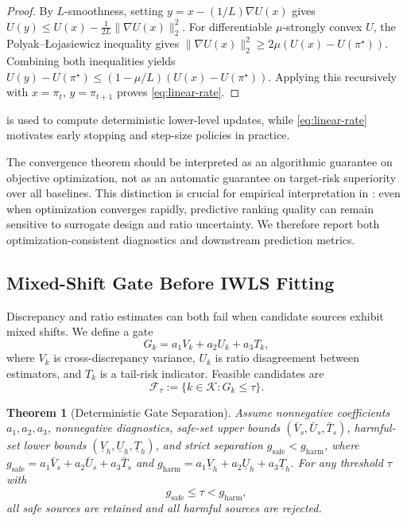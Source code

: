 \documentclass{article} %
\newtheorem{theorem}{Theorem}[section]
\begin{document}
\begin{proof}
By \(L\)-smoothness, setting \(y=x-(1/L)\nabla U(x)\) gives
\(U(y)\le U(x)-\frac{1}{2L}\|\nabla U(x)\|_2^2\).
For differentiable \(\mu\)-strongly convex \(U\), the Polyak--\L{}ojasiewicz inequality gives
\(\|\nabla U(x)\|_2^2\ge2\mu(U(x)-U(\pi^{\star}))\).
Combining both inequalities yields
\(U(y)-U(\pi^{\star})\le(1-\mu/L)(U(x)-U(\pi^{\star}))\).
Applying this recursively with \(x=\pi_t\), \(y=\pi_{t+1}\) proves \eqref{eq:linear-rate}.
\end{proof}

 is used to compute deterministic lower-level updates, while \eqref{eq:linear-rate} motivates early stopping and step-size policies in practice.

The convergence theorem should be interpreted as an algorithmic guarantee on objective optimization, not as an automatic guarantee on target-risk superiority over all baselines. This distinction is crucial for empirical interpretation in : even when optimization converges rapidly, predictive ranking quality can remain sensitive to surrogate design and ratio uncertainty. We therefore report both optimization-consistent diagnostics and downstream prediction metrics.

\subsection{Mixed-Shift Gate Before IWLS Fitting}
Discrepancy and ratio estimates can both fail when candidate sources exhibit mixed shifts. We define a gate
\begin{equation}
G_k=a_1V_k+a_2U_k+a_3T_k,
\label{eq:gate-score}
\end{equation}
where \(V_k\) is cross-discrepancy variance, \(U_k\) is ratio disagreement between estimators, and \(T_k\) is a tail-risk indicator. Feasible candidates are
\begin{equation}
\mathcal{F}_\tau:=\{k\in\mathcal{K}: G_k\le \tau\}.
\label{eq:gate-feasible}
\end{equation}

\begin{theorem}[Deterministic Gate Separation]
\label{thm:gate}
Assume nonnegative coefficients \(a_1,a_2,a_3\), nonnegative diagnostics, safe-set upper bounds \((\bar V_s,\bar U_s,\bar T_s)\), harmful-set lower bounds \((\underline V_h,\underline U_h,\underline T_h)\), and strict separation
\(g_{\mathrm{safe}}<g_{\mathrm{harm}}\), where
\(g_{\mathrm{safe}}=a_1\bar V_s+a_2\bar U_s+a_3\bar T_s\) and
\(g_{\mathrm{harm}}=a_1\underline V_h+a_2\underline U_h+a_3\underline T_h\).
For any threshold \(\tau\) with
\begin{equation}
g_{\mathrm{safe}}\le\tau<g_{\mathrm{harm}},
\label{eq:gate-threshold}
\end{equation}
all safe sources are retained and all harmful sources are rejected.
\end{theorem}
\end{document}
